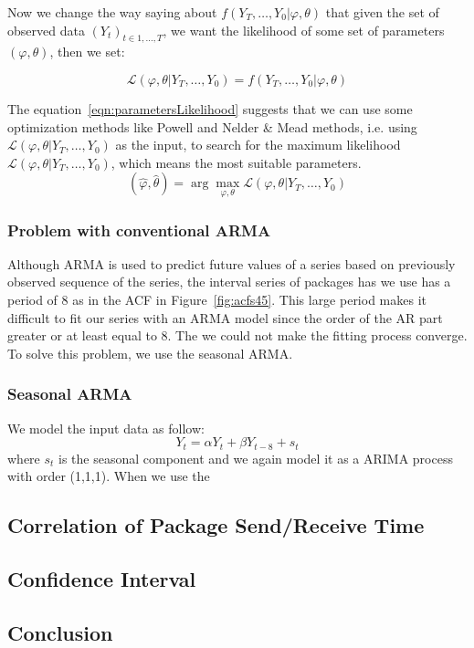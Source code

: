 \documentclass[12pt]{article}
\begin{document}
Now we change the way saying about $f(Y_T,\ldots,Y_0|\varphi, \theta)$ that
given the set of observed data $(Y_t)_{t\in 1, \ldots, T}$, we want the likelihood of
some set of parameters $(\varphi, \theta)$, then we set:

\begin{equation}\label{eqn:parametersLikelihood}
\mathcal{L}(\varphi, \theta|Y_T,\ldots, Y_0) = f(Y_T,\ldots,Y_0|\varphi,
\theta)
\end{equation}

The equation~\ref{eqn:parametersLikelihood} suggests that we can use some
optimization methods like Powell and Nelder \& Mead methods, i.e. using
$\mathcal{L}(\varphi, \theta|Y_T,\ldots, Y_0)$ as the input, to search for the
maximum likelihood $\mathcal{L}(\varphi, \theta|Y_T,\ldots, Y_0)$, which means
the most suitable parameters.
\begin{equation}
(\hat{\varphi},\hat{\theta})=\arg\max_{\varphi, \theta} \mathcal{L}(\varphi,
\theta|Y_T,\ldots, Y_0)
\end{equation}

\subsubsection{Problem with conventional ARMA}
Although ARMA is used to predict future values of a series based on
previously observed sequence of the series, the interval series of packages has
we use has a period of 8 as in the ACF in Figure~\ref{fig:acfs45}. This large
period makes it difficult to fit our series with an ARMA model since the order of the AR
part greater or at least equal to 8. The we could not make the fitting process
converge. To solve this problem, we use the seasonal ARMA.

\subsubsection{Seasonal ARMA}
We model the input data as follow:
\begin{equation}
Y_t = \alpha Y_t+\beta Y_{t-8}+s_t
\end{equation}
where $s_t$ is the seasonal component and we again model it as a ARIMA process
with order (1,1,1). When we use the 

\subsection{Correlation of Package Send/Receive Time}
\subsection{Confidence Interval}

\subsection{Conclusion}



\end{document}
